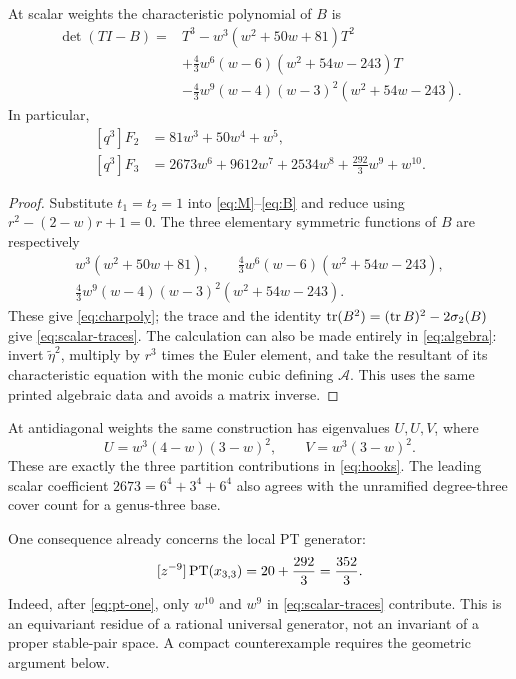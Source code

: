 \begin{proposition}\label{prop:trace}
At scalar weights the characteristic polynomial of $B$ is
\begin{equation}\label{eq:charpoly}
 \begin{split}
 \det(TI-B)={}&T^3-w^3(w^2+50w+81)T^2\\
 &+\frac43w^6(w-6)(w^2+54w-243)T\\
 &-\frac43w^9(w-4)(w-3)^2(w^2+54w-243).
 \end{split}
\end{equation}
In particular,
\begin{equation}\label{eq:scalar-traces}
 \begin{split}
 [q^3]F_2&=81w^3+50w^4+w^5,\\
 [q^3]F_3&=2673w^6+9612w^7+2534w^8+\frac{292}{3}w^9+w^{10}.
 \end{split}
\end{equation}
\end{proposition}
\begin{proof}
Substitute $t_1=t_2=1$ into \eqref{eq:M}--\eqref{eq:B} and reduce
using $r^2-(2-w)r+1=0$. The three elementary symmetric functions
of $B$ are respectively
\[
 \begin{gathered}
 w^3(w^2+50w+81),\qquad
 \frac43w^6(w-6)(w^2+54w-243),\\
 \frac43w^9(w-4)(w-3)^2(w^2+54w-243).
 \end{gathered}
\]
These give \eqref{eq:charpoly}; the trace and the identity
$\operatorname{tr}(B^2)=(\operatorname{tr} B)^2-2\sigma_2(B)$ give \eqref{eq:scalar-traces}.
The calculation can also be made entirely in \eqref{eq:algebra}:
invert $\widetilde\eta^2$, multiply by $r^3$ times the Euler
element, and take the resultant of its characteristic equation with
the monic cubic defining $\mathcal A$. This uses the same printed
algebraic data and avoids a matrix inverse.
\end{proof}

At antidiagonal weights the same construction has eigenvalues $U,U,V$,
where
\begin{equation}\label{eq:UV}
 U=w^3(4-w)(3-w)^2,\qquad V=w^3(3-w)^2.
\end{equation}
These are exactly the three partition contributions in
\eqref{eq:hooks}. The leading scalar coefficient
$2673=6^4+3^4+6^4$ also agrees with the unramified degree-three
cover count for a genus-three base.

One consequence already concerns the local PT generator:
\begin{equation}\label{eq:local-pt}
 [z^{-9}]\operatorname{PT}(x_{3,3})=20+\frac{292}{3}=\frac{352}{3}.
\end{equation}
Indeed, after \eqref{eq:pt-one}, only $w^{10}$ and $w^9$ in
\eqref{eq:scalar-traces} contribute. This is an equivariant residue
of a rational universal generator, not an invariant of a proper
stable-pair space. A compact counterexample requires the geometric
argument below.

